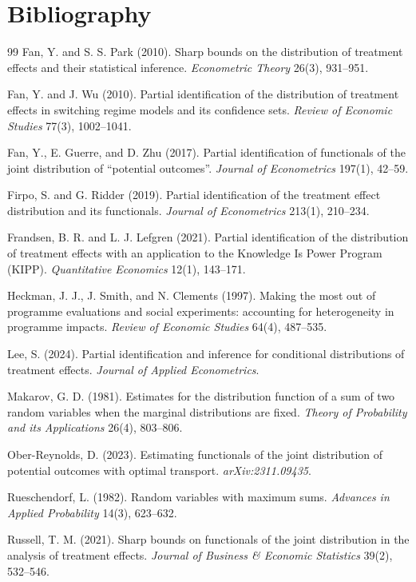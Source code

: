 \documentclass[11pt]{article}
\theoremstyle{definition}
\theoremstyle{plain}
\theoremstyle{remark}
\begin{document}
\section*{Bibliography}
\begin{thebibliography}{99}
Fan, Y. and S. S. Park (2010).
Sharp bounds on the distribution of treatment effects and their statistical inference.
\emph{Econometric Theory} 26(3), 931--951.

Fan, Y. and J. Wu (2010).
Partial identification of the distribution of treatment effects in switching regime models and its confidence sets.
\emph{Review of Economic Studies} 77(3), 1002--1041.

Fan, Y., E. Guerre, and D. Zhu (2017).
Partial identification of functionals of the joint distribution of ``potential outcomes''.
\emph{Journal of Econometrics} 197(1), 42--59.

Firpo, S. and G. Ridder (2019).
Partial identification of the treatment effect distribution and its functionals.
\emph{Journal of Econometrics} 213(1), 210--234.

Frandsen, B. R. and L. J. Lefgren (2021).
Partial identification of the distribution of treatment effects with an application to the Knowledge Is Power Program (KIPP).
\emph{Quantitative Economics} 12(1), 143--171.

Heckman, J. J., J. Smith, and N. Clements (1997).
Making the most out of programme evaluations and social experiments: accounting for heterogeneity in programme impacts.
\emph{Review of Economic Studies} 64(4), 487--535.

Lee, S. (2024).
Partial identification and inference for conditional distributions of treatment effects.
\emph{Journal of Applied Econometrics}.

Makarov, G. D. (1981).
Estimates for the distribution function of a sum of two random variables when the marginal distributions are fixed.
\emph{Theory of Probability and its Applications} 26(4), 803--806.

Ober-Reynolds, D. (2023).
Estimating functionals of the joint distribution of potential outcomes with optimal transport.
\emph{arXiv:2311.09435}.

Rueschendorf, L. (1982).
Random variables with maximum sums.
\emph{Advances in Applied Probability} 14(3), 623--632.

Russell, T. M. (2021).
Sharp bounds on functionals of the joint distribution in the analysis of treatment effects.
\emph{Journal of Business \& Economic Statistics} 39(2), 532--546.
\end{thebibliography}
\end{document}
